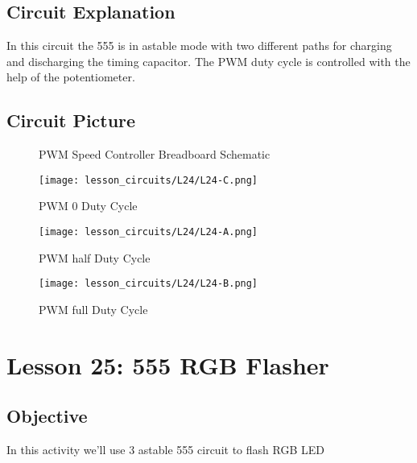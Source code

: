 \subsection{Circuit Explanation}
In this circuit the 555 is in astable mode with two different paths for charging and discharging the timing capacitor. The PWM duty 
cycle is controlled with the help of the potentiometer.
\subsection{Circuit Picture}
\begin{figure}[!htp]
    \centering
    \caption{PWM Speed Controller Breadboard Schematic}
    \label{fig:555_pwm_sch}
\end{figure}
\begin{figure}[!htp]
    \centering
    \texttt{[image: lesson\_circuits/L24/L24-C.png]}
    \caption{PWM 0 Duty Cycle}
    \label{fig:555_pwm_obb}
\end{figure}
\begin{figure}[!htp]
    \centering
    \texttt{[image: lesson\_circuits/L24/L24-A.png]}
    \caption{PWM half Duty Cycle}
    \label{fig:555_pwm_obb1}
\end{figure}
\begin{figure}[!htp]
    \centering
    \texttt{[image: lesson\_circuits/L24/L24-B.png]}
    \caption{PWM full Duty Cycle}
    \label{fig:555_pwm_obb2}
\end{figure}
\section{Lesson 25: 555 RGB Flasher}
\subsection{Objective}
In this activity we'll use 3 astable 555 circuit to flash RGB LED
